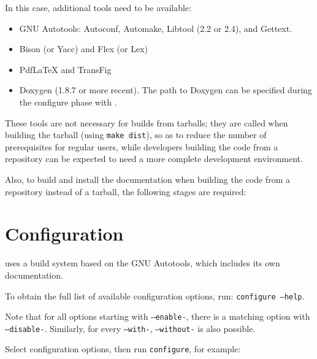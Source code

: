 \documentclass[a4paper,10pt,twoside]{csshortdoc}
\begin{document}
In this case, additional tools need to be available:

\begin{itemize}
\item GNU Autotools: Autoconf, Automake, Libtool (2.2 or 2.4), and Gettext.
\item Bison (or Yacc) and Flex (or Lex)
\item PdfLaTeX and TransFig
\item Doxygen (1.8.7 or more recent). The path to Doxygen can be specified during
the configure phase with .
\end{itemize}

These tools are not necessary for builds from tarballs; they
are called when building the tarball (using {\tt make dist}), so
as to reduce the number of prerequisites for regular users, while
developers building the code from a repository can be expected to
need a more complete development environment.

Also, to build and install the documentation when building the code
from a repository instead of a tarball, the following stages are required:


\section{Configuration\label{sec:config}}

\CS uses a build system based on the GNU Autotools, which includes
its own documentation.

To obtain the full list of available configuration options,
run: {\tt configure~--help}.

Note that for all options starting with {\tt --enable-},
there is a matching option with {\tt --disable-}. Similarly,
for every {\tt --with-}, {\tt --without-} is also possible.

Select configuration options, then run {\tt configure}, for example:

\end{document}
